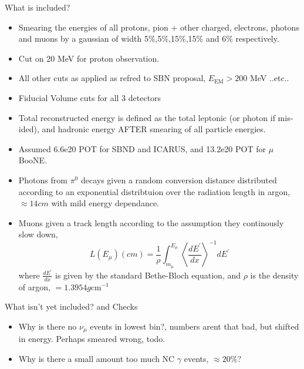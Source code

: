 \documentclass[12pt, a4paper]{article}
\begin{document}
What is included?
\begin{itemize}
	\item Smearing the energies of all protons, pion + other charged, electrons, photons and muons by a gaussian of width 5\%,5\%,15\%,15\% and 6\% respectively.
	\item Cut on 20 MeV for proton observation.
	\item All other cuts as applied as refred to SBN proposal, $E_\text{EM}> 200$ MeV ..etc..
	\item Fiducial Volume cuts for all 3 detectors
	\item Total reconstructed energy is defined as the total leptonic (or photon if mis-ided), and hadronic energy AFTER smearing of all particle energies.
	\item Assumed 6.6e20 POT for SBND and ICARUS, and 13.2e20 POT for $\mu$BooNE.
	\item Photons from $\pi^0$ decays given a random conversion distance distributed according to an exponential distribtuion over the radiation length in argon, $\approx 14cm$ with mild energy dependance.
	\item Muons given a track length according to the assumption they continously slow down,
		\[
			L(E_\mu) (cm) = \frac{1}{\rho}\int^{E_\mu}_{m_\mu} \left\langle\frac{d E^\prime}{dx} \right\rangle^{-1} dE^\prime
		\]
		where $\frac{d E^\prime}{dx}$ is given by the standard Bethe-Bloch equation, and $\rho$ is the density of argon, $=1.3954 g \text{cm}^{-1}$


\end{itemize}
What isn't yet included? and Checks
\begin{itemize}
	\item Why is there no $\nu_\mu$ events in lowest bin?, numbers arent that bad, but shifted in energy. Perhaps smeared wrong, todo.
	\item Why is there a small amount too much NC $\gamma$ events, $\approx 20\%$?
\end{itemize}





\end{document}
